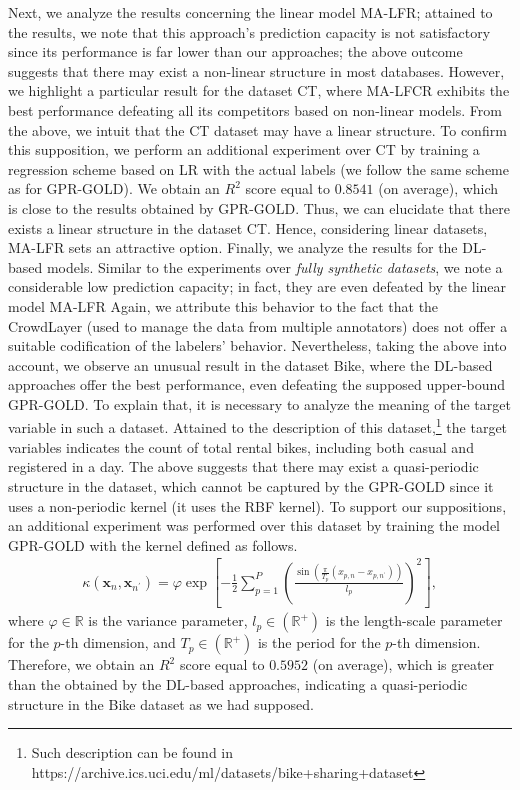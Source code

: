 \documentclass[journal]{IEEEtran}
\newcommand{\Real}{\mathbb{R}}
\newcommand{\boldx}{\mathbf{x}}
\begin{document}
Next, we analyze the results concerning the linear model MA-LFR; attained to the results, we note that this approach's prediction capacity is not satisfactory since its performance is far lower than our approaches; the above outcome suggests that there may exist a non-linear structure in most databases. However, we highlight a particular result for the dataset CT, where MA-LFCR exhibits the best performance defeating all its competitors based on non-linear models. From the above, we intuit that the CT dataset may have a linear structure. To confirm this supposition, we perform an additional experiment over CT by training a regression scheme based on LR with the actual labels (we follow the same scheme as for GPR-GOLD). We obtain an $R^2$ score equal to $0.8541$ (on average), which is close to the results obtained by GPR-GOLD. Thus, we can elucidate that there exists a linear structure in the dataset CT. Hence, considering linear datasets, MA-LFR sets an attractive option. Finally, we analyze the results for the DL-based models. Similar to the experiments over \textit{fully synthetic datasets}, we note a considerable low prediction capacity; in fact, they are even defeated by the linear model MA-LFR Again, we attribute this behavior to the fact that the CrowdLayer (used to manage the data from multiple annotators) does not offer a suitable codification of the labelers' behavior. Nevertheless, taking the above into account, we observe an unusual result in the dataset Bike, where the DL-based approaches offer the best performance, even defeating the supposed upper-bound GPR-GOLD. To explain that, it is necessary to analyze the meaning of the target variable in such a dataset.  Attained to the description of this dataset,\footnote{Such description can be found in https://archive.ics.uci.edu/ml/datasets/bike+sharing+dataset} the target variables indicates the count of total rental bikes, including both casual and registered in a day. The above suggests that there may exist a quasi-periodic structure in the dataset, which cannot be captured by the GPR-GOLD since it uses a non-periodic kernel (it uses the RBF kernel). To support our suppositions, an additional experiment was performed over this dataset by training the model GPR-GOLD with the kernel defined as follows. 
\begin{align}\label{eq:Pkernel}
\kappa(\boldx_n, \boldx_{n^{\prime}}) = \varphi \exp \left[  - \frac{1}{2}\sum_{p=1}^{P}\left( \frac{\sin(\frac{\pi}{T_p} (x_{p,n}- x_{p,n^{\prime}}) )}{l_p}\right)^2 \right],
\end{align}
where $\varphi\in \Real$ is the variance parameter, $l_p\in (\Real^{+})$ is the length-scale parameter for the $p$-th dimension, and $T_p\in (\Real^{+})$ is the period for the $p$-th dimension. Therefore, we obtain an $R^2$ score equal to $0.5952$ (on average), which is greater than the obtained by the DL-based approaches, indicating a quasi-periodic structure in the Bike dataset as we had supposed.
\end{document}
